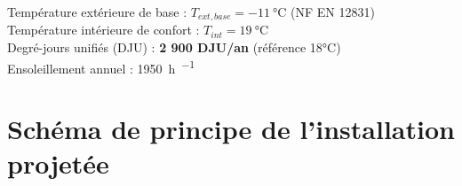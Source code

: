 \begin{definition}
  Température extérieure de base : $T_{ext,base} = \SI{-11}{\celsius}$ (NF EN 12831) \\
  Température intérieure de confort : $T_{int} = \SI{19}{\celsius}$ \\
  Degré-jours unifiés (DJU) : \textbf{2 900 DJU/an} (référence 18°C) \\
  Ensoleillement annuel : \SI{1950}{\hour\per\year}
\end{definition}

\section{Schéma de principe de l'installation projetée}


